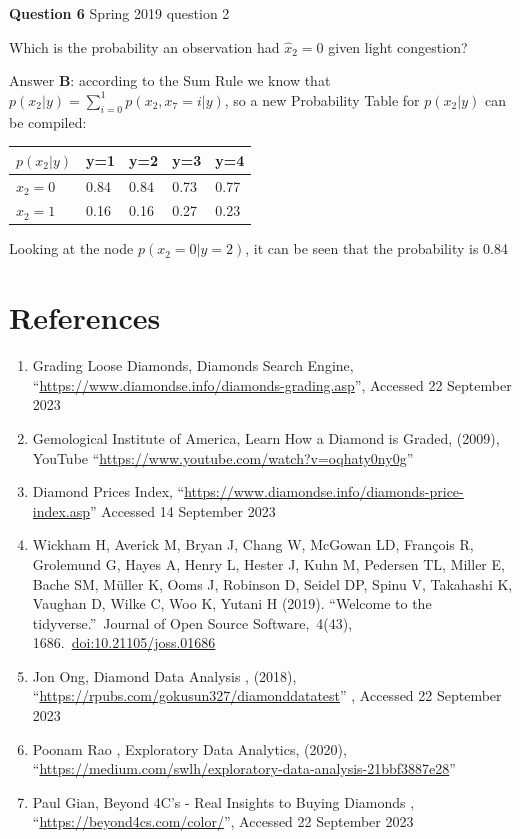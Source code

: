 \documentclass[
]{article}
\begin{document}
\textbf{Question 6} \textbar{} Spring 2019 question 2

Which is the probability an observation had \(\hat{x}_2=0\) given light
congestion?

Answer \textbf{B}: according to the Sum Rule we know that
\(p(x_2|y)=\sum_{i=0}^1 p(x_2,x_7=i|y)\), so a new Probability Table for
\(p(x_2|y)\) can be compiled:

\begin{longtable}[]{@{}lllll@{}}
\toprule\noalign{}
\(p(x_2 |y)\) & y=1 & y=2 & y=3 & y=4 \\
\midrule\noalign{}
\endhead
\bottomrule\noalign{}
\endlastfoot
\(x_2=0\) & 0.84 & 0.84 & 0.73 & 0.77 \\
\(x_2=1\) & 0.16 & 0.16 & 0.27 & 0.23 \\
\end{longtable}

Looking at the node \(p(x_2=0|y=2)\), it can be seen that the
probability is 0.84

\newpage

\section{References}\label{references}

\begin{enumerate}
\def\labelenumi{\arabic{enumi})}
\item
  Grading Loose Diamonds, Diamonds Search Engine,
  ``\url{https://www.diamondse.info/diamonds-grading.asp}'', Accessed 22
  September 2023
\item
  Gemological Institute of America, Learn How a Diamond is Graded,
  (2009), YouTube ``\url{https://www.youtube.com/watch?v=oqhaty0ny0g}''
\item
  Diamond Prices Index,
  ``\url{https://www.diamondse.info/diamonds-price-index.asp}'' Accessed
  14 September 2023
\item
  Wickham H, Averick M, Bryan J, Chang W, McGowan LD, François R,
  Grolemund G, Hayes A, Henry L, Hester J, Kuhn M, Pedersen TL, Miller
  E, Bache SM, Müller K, Ooms J, Robinson D, Seidel DP, Spinu V,
  Takahashi K, Vaughan D, Wilke C, Woo K, Yutani H (2019). ``Welcome to
  the tidyverse.''~Journal of Open Source Software,~4(43),
  1686.~\url{doi:10.21105/joss.01686}
\item
  Jon Ong, Diamond Data Analysis , (2018),
  ``\url{https://rpubs.com/gokusun327/diamonddatatest}'' , Accessed 22
  September 2023
\item
  Poonam Rao , Exploratory Data Analytics, (2020),
  ``\url{https://medium.com/swlh/exploratory-data-analysis-21bbf3887e28}''
\item
  Paul Gian, Beyond 4C's - Real Insights to Buying Diamonds ,
  ``\url{https://beyond4cs.com/color/}'', Accessed 22 September 2023
\end{enumerate}
\end{document}
